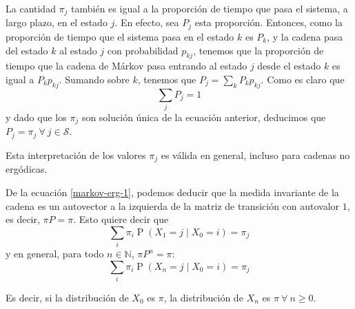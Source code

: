 \documentclass[11pt]{article}
\theoremstyle{plain}
\theoremstyle{definition}
\theoremstyle{remark}
\newcommand{\proba}{\ensuremath{\operatorname{P}}}  %
\newcommand{\espm}[0]{\ensuremath{\mathcal{S}}}  %
\newcommand{\foralle}{\ensuremath{\forall \ }}  %
\begin{document}
    La cantidad $\pi_j$ también es igual a la proporción de tiempo que pasa el sistema, a largo plazo, en el estado $j$. En efecto, sea $P_j$ esta proporción. Entonces, como la proporción de tiempo que el sistema pasa en el estado $k$ es $P_k$, y la cadena pasa del estado $k$ al estado $j$ con probabilidad $p_{kj}$, tenemos que la proporción de tiempo que la cadena de Márkov pasa entrando al estado $j$ desde el estado $k$ es igual a $P_k p_{kj}$. Sumando sobre $k$, tenemos que $P_j = \sum_k P_k p_{kj}$. Como es claro que
    \[ \sum_j P_j = 1 \]
    y dado que los $\pi_j$ son solución única de la ecuación anterior, deducimos que $P_j = \pi_j \ \foralle j \in \espm$.

    Esta interpretación de los valores $\pi_j$ es válida en general, incluso para cadenas no ergódicas.

    De la ecuación \eqref{markov-erg-1}, podemos deducir que la medida invariante de la cadena es un autovector a la izquierda de la matriz de transición con autovalor $1$, es decir, $ \pi P = \pi $. Esto quiere decir que
    \[ \sum_i \pi_i \proba(X_1 = j \mid X_0 = i) = \pi_j \]
    y en general, para todo $n \in \mathbb{N}$, $\pi P^n = \pi$:
    \[ \sum_i \pi_i \proba(X_n = j \mid X_0 = i) = \pi_j \]

    Es decir, si la distribución de $X_0$ es $\pi$, la distribución de $X_n$ es $\pi \ \foralle n \geq 0$.
\end{document}
